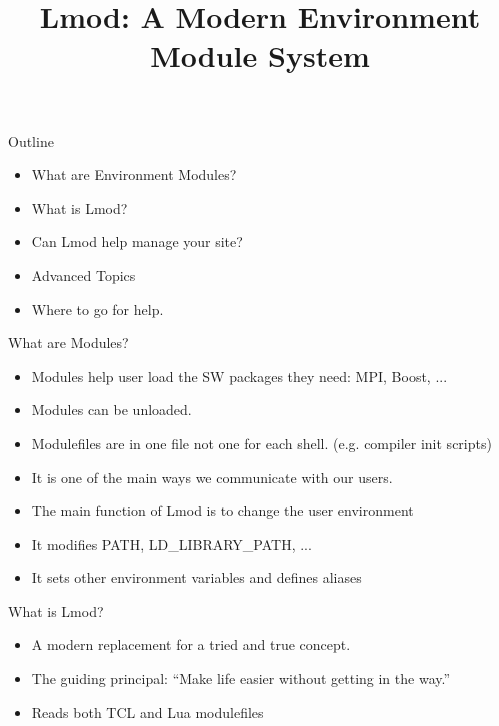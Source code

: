 \documentclass{beamer}
\begin{document}
\title[Lmod]{Lmod: A Modern Environment Module System}

\frame{\titlepage} 

\begin{frame}{Outline}
  \begin{itemize}
    \item What are Environment Modules?
    \item What is Lmod?
    \item Can Lmod help manage your site?
    \item Advanced Topics
    \item Where to go for help.
  \end{itemize}
\end{frame}

\begin{frame}{What are Modules?}
  \begin{itemize}
    \item Modules help user load the SW packages they need: MPI, Boost, ...
    \item Modules can be unloaded.
    \item Modulefiles are in one file not one for each
      shell. (e.g. compiler init scripts)
    \item It is one of the main ways we communicate with our users.
    \item The main function of Lmod is to change the user environment
    \item It modifies PATH, LD_LIBRARY_PATH, ...
    \item It sets other environment variables and defines aliases
  \end{itemize}
\end{frame}

\begin{frame}{What is Lmod?}
  \begin{itemize}
    \item A modern replacement for a tried and true concept.
    \item The guiding principal: ``Make life easier without getting in
      the way.''
    \item Reads both TCL and Lua modulefiles
  \end{itemize}
\end{frame}
\end{document}
